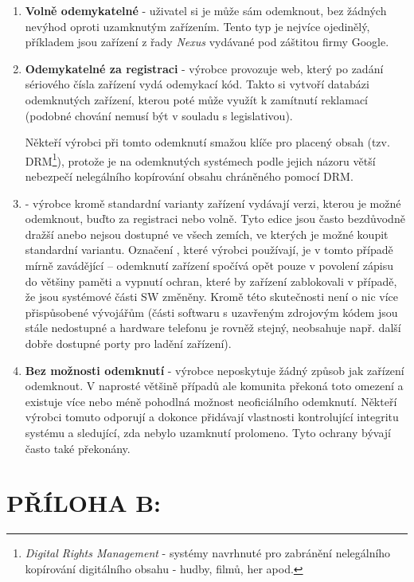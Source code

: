 \documentclass[12pt, a4paper, oneside]{article}
\newcommand{\B}{\textbf} %
\newcommand{\It}{\textit}  %
\begin{document}
\begin{enumerate}
    \item \B{Volně odemykatelné} - uživatel si je může sám odemknout, bez žádných nevýhod oproti uzamknutým zařízením. Tento typ je nejvíce ojedinělý, příkladem jsou zařízení z řady \It{Nexus} vydávané pod záštitou firmy Google.
    
    \item \B{Odemykatelné za registraci} - výrobce provozuje web, který po zadání sériového čísla zařízení vydá odemykací kód. Takto si vytvoří databázi odemknutých zařízení, kterou poté může využít k zamítnutí reklamací (podobné chování nemusí být v souladu s legislativou).
    
    Někteří výrobci při tomto odemknutí smažou klíče pro placený obsah (tzv. DRM\footnote{\It{Digital Rights Management} - systémy navrhnuté pro zabránění nelegálního kopírování digitálního obsahu - hudby, filmů, her apod.}), protože je na odemknutých systémech podle jejich názoru větší nebezpečí nelegálního kopírování obsahu chráněného pomocí DRM.
    
    \item \B{} - výrobce kromě standardní varianty zařízení vydávají verzi, kterou je možné odemknout, buďto za registraci nebo volně. Tyto edice jsou často bezdůvodně dražší anebo nejsou dostupné ve všech zemích, ve kterých je možné koupit standardní variantu. Označení , které výrobci používají, je v tomto případě mírně zavádějící -- odemknutí zařízení spočívá opět pouze v povolení zápisu do většiny paměti a vypnutí ochran, které by zařízení zablokovali v případě, že jsou systémové části SW změněny. Kromě této skutečnosti není o nic více přispůsobené vývojářům (části softwaru s uzavřeným zdrojovým kódem jsou stále nedostupné a hardware telefonu je rovněž stejný, neobsahuje např. další dobře dostupné porty pro ladění zařízení).

    \item \B{Bez možnosti odemknutí} - výrobce neposkytuje žádný způsob jak zařízení odemknout. V naprosté většině případů ale komunita překoná toto omezení a existuje více nebo méně pohodlná možnost neoficiálního odemknutí. Někteří výrobci tomuto odporují a dokonce přidávají vlastnosti kontrolující integritu systému a sledující, zda nebylo uzamknutí prolomeno. Tyto ochrany bývají často také překonány.
    
\end{enumerate}

\newpage
\section*{PŘÍLOHA B:}
\end{document}
